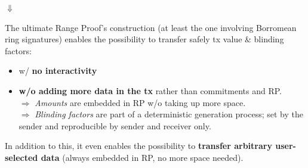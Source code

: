 \documentclass[10.5pt,compress]{beamer}
\begin{document}
\begin{frame}
    \begin{center}
        $\Downarrow$
    \end{center}
    The ultimate Range Proof's construction (at least the one involving Borromean ring signatures) enables the possibility to transfer safely tx value \& blinding factors:
    \begin{itemize}
        \item w/ \textbf{no interactivity}
        \item \textbf{w/o adding more data in the tx} rather than commitments and RP.\\
        $\Rightarrow$ \textit{Amounts} are embedded in RP w/o taking up more space.\\
        $\Rightarrow$ \textit{Blinding factors} are part of a deterministic generation process; set by the sender and reproducible by sender and receiver only. %
    \end{itemize}
    In addition to this, it even enables the possibility to \textbf{transfer arbitrary user-selected data} (always embedded in RP, no more space needed). 
\end{frame}
\end{document}
